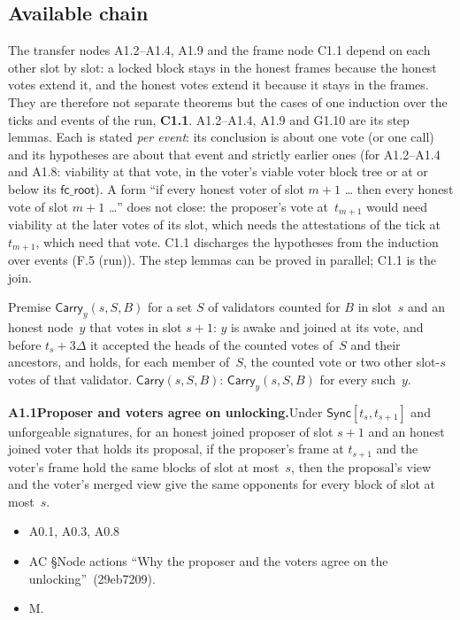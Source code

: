 \documentclass{article}
\newcommand{\fcroot}{\mathsf{fc\_root}}
\newcommand{\dagnode}[6]{%
\par\medskip\noindent\textbf{#1\enspace #2.}\enspace #3
\begin{itemize}[leftmargin=2.2em,itemsep=0pt,topsep=2pt]
\item[\emph{Uses}] #4
\item[\emph{Evid.}] #5
\item[\emph{Task}] #6
\end{itemize}}
\begin{document}
\subsection{Available chain}

The transfer nodes A1.2--A1.4, A1.9 and the frame node C1.1 depend on each other
slot by slot: a locked block stays in the honest frames because the honest
votes extend it, and the honest votes extend it because it stays in the
frames.  They are therefore not separate theorems but the cases of one
induction over the ticks and events of the run, \textbf{C1.1}.  A1.2--A1.4,
A1.9 and G1.10 are its step lemmas.  Each is stated \emph{per event}: its
conclusion is about one vote (or one call) and its hypotheses are about that
event and strictly earlier ones (for A1.2--A1.4 and A1.8: viability at that
vote, in the voter's viable voter block tree or at or below its $\fcroot$).  A
form ``if every honest voter of slot $m+1$ \ldots{} then every honest vote of
slot $m+1$ \ldots'' does not close: the proposer's vote at~$t_{m+1}$ would need
viability at the later votes of its slot, which needs the attestations of the tick
at~$t_{m+1}$, which need that vote.  C1.1 discharges the hypotheses from the
induction over events (F.5 (run)).  The step lemmas can be proved in parallel; C1.1
is the join.

Premise $\mathsf{Carry}_y(s,S,B)$ for a set $S$ of validators counted for $B$ in
slot~$s$ and an honest node~$y$ that votes in slot $s+1$: $y$ is awake and joined
at its vote, and before $t_s+3\Delta$ it accepted the heads of the counted
votes of~$S$ and their ancestors, and holds, for each member of~$S$, the counted
vote or two other slot-$s$ votes of that validator.  $\mathsf{Carry}(s,S,B)$:
$\mathsf{Carry}_y(s,S,B)$ for every such~$y$.

\dagnode{A1.1}{Proposer and voters agree on unlocking}{Under
$\mathsf{Sync}[t_s,t_{s+1}]$ and unforgeable signatures, for an honest joined
proposer of slot $s+1$ and an honest joined voter that holds its proposal, if
the proposer's frame at $t_{s+1}$ and the voter's frame hold the same blocks of
slot at most~$s$, then the proposal's view and the voter's merged view give the
same opponents for every block of slot at most~$s$.}
{A0.1, A0.3, A0.8}{AC \S Node actions ``Why the proposer and the voters agree on
the unlocking''~(29eb7209).}{M.}
\end{document}

